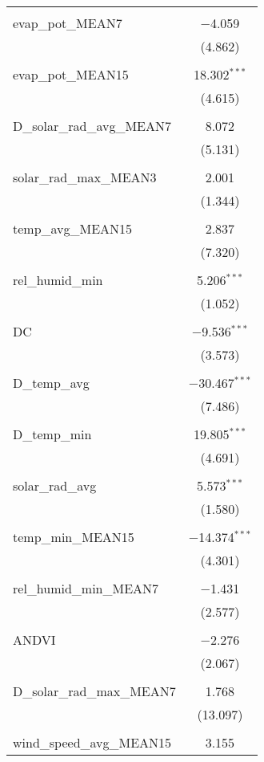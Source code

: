 \begin{table}[!htbp]
\begin{tabular}{@{\extracolsep{5pt}}lc}
  & \\ 
 evap\_pot\_MEAN7 & $-$4.059 \\ 
  & (4.862) \\ 
  & \\ 
 evap\_pot\_MEAN15 & 18.302$^{***}$ \\ 
  & (4.615) \\ 
  & \\ 
 D\_solar\_rad\_avg\_MEAN7 & 8.072 \\ 
  & (5.131) \\ 
  & \\ 
 solar\_rad\_max\_MEAN3 & 2.001 \\ 
  & (1.344) \\ 
  & \\ 
 temp\_avg\_MEAN15 & 2.837 \\ 
  & (7.320) \\ 
  & \\ 
 rel\_humid\_min & 5.206$^{***}$ \\ 
  & (1.052) \\ 
  & \\ 
 DC & $-$9.536$^{***}$ \\ 
  & (3.573) \\ 
  & \\ 
 D\_temp\_avg & $-$30.467$^{***}$ \\ 
  & (7.486) \\ 
  & \\ 
 D\_temp\_min & 19.805$^{***}$ \\ 
  & (4.691) \\ 
  & \\ 
 solar\_rad\_avg & 5.573$^{***}$ \\ 
  & (1.580) \\ 
  & \\ 
 temp\_min\_MEAN15 & $-$14.374$^{***}$ \\ 
  & (4.301) \\ 
  & \\ 
 rel\_humid\_min\_MEAN7 & $-$1.431 \\ 
  & (2.577) \\ 
  & \\ 
 ANDVI & $-$2.276 \\ 
  & (2.067) \\ 
  & \\ 
 D\_solar\_rad\_max\_MEAN7 & 1.768 \\ 
  & (13.097) \\ 
  & \\ 
 wind\_speed\_avg\_MEAN15 & 3.155 \\ 

\end{tabular}
\end{table}

